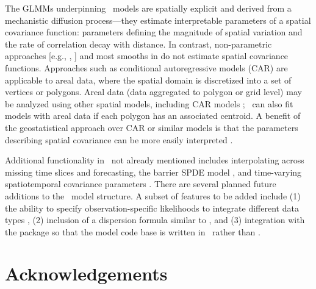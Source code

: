 \documentclass[article]{jss}\usepackage[]{graphicx}\usepackage[dvipsnames]{xcolor}
\newcommand{\sdmTMB}{\pkg{sdmTMB}}
\newcommand{\R}{\proglang{R}}
\begin{document}
The GLMMs underpinning \sdmTMB\ models are spatially explicit and derived from a mechanistic diffusion process---they estimate interpretable parameters of a spatial covariance function: parameters defining the magnitude of spatial variation and the rate of correlation decay with distance.
In contrast, non-parametric approaches [e.g.,  \citep{liaw2002},  \citep{phillips2006}] and most smooths in  \citep{wood2017a} do not estimate spatial covariance functions.
Approaches such as conditional autoregressive models (CAR) are applicable to areal data, where the spatial domain is discretized into a set of vertices or polygons.
Areal data (data aggregated to polygon or grid level) may be analyzed using other spatial models, including CAR models \citep[e.g.,][]{verhoef2018}; \sdmTMB\ can also fit models with areal data if each polygon has an associated centroid.
A benefit of the geostatistical approach over CAR or similar models is that the parameters describing spatial covariance can be more easily interpreted \citep{wall2004}.

Additional functionality in \sdmTMB\ not already mentioned includes interpolating across missing time slices and forecasting, the barrier SPDE model \citep{bakka2019}, and time-varying spatiotemporal covariance parameters \citep{ward2022}.
There are several planned future additions to the \sdmTMB\ model structure.
A subset of features to be added include
(1) the ability to specify observation-specific likelihoods to integrate different data types \citep[e.g.,][]{gruss2019multiple},
(2) inclusion of a dispersion formula similar to , and
(3) integration with the  \citep{rtmb} package so that the model code base is written in \R\ rather than .

\section{Acknowledgements}\label{acknowledgements}
\end{document}
